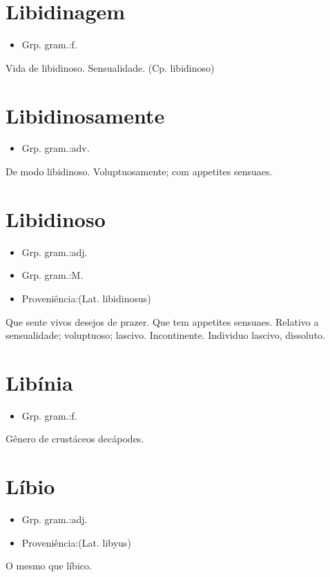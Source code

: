 \section{Libidinagem}
\begin{itemize}
\item {Grp. gram.:f.}
\end{itemize}
Vida de libidinoso.
Sensualidade.
(Cp. \textunderscore libidinoso\textunderscore )
\section{Libidinosamente}
\begin{itemize}
\item {Grp. gram.:adv.}
\end{itemize}
De modo libidinoso.
Voluptuosamente; com appetites sensuaes.
\section{Libidinoso}
\begin{itemize}
\item {Grp. gram.:adj.}
\end{itemize}
\begin{itemize}
\item {Grp. gram.:M.}
\end{itemize}
\begin{itemize}
\item {Proveniência:(Lat. \textunderscore libidinosus\textunderscore )}
\end{itemize}
Que sente vivos desejos de prazer.
Que tem appetites sensuaes.
Relativo a sensualidade; voluptuoso; lascivo.
Incontinente.
Individuo lascivo, dissoluto.
\section{Libínia}
\begin{itemize}
\item {Grp. gram.:f.}
\end{itemize}
Gênero de crustáceos decápodes.
\section{Líbio}
\begin{itemize}
\item {Grp. gram.:adj.}
\end{itemize}
\begin{itemize}
\item {Proveniência:(Lat. \textunderscore libyus\textunderscore )}
\end{itemize}
O mesmo que \textunderscore líbico\textunderscore .
